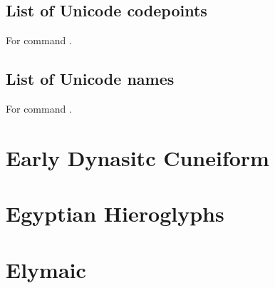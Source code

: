 \subsection{List of Unicode codepoints}
For command \codedetok{\cytransuc{}}.
\begin{multicols}{4}\noindent
\cytag
\cyshowplainlistuc
\eolist
\end{multicols}

\subsection{List of Unicode names}
For command \codedetok{\cytransun{}}.
\begin{multicols}{4}\noindent
\cytag
\cyshowplainlistun
\eolist
\end{multicols}

%








\section{Early Dynasitc Cuneiform}

\section{Egyptian Hieroglyphs}

\section{Elymaic}


